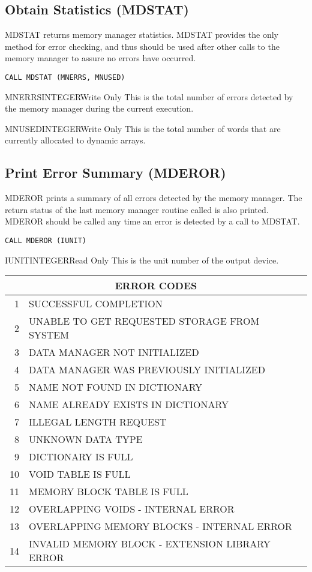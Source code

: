 \subsection{Obtain Statistics (MDSTAT)}
MDSTAT returns memory manager statistics.  MDSTAT provides the only method
for error checking, and thus should be used after other calls to the memory
manager to assure no errors have occurred.

\verb+CALL MDSTAT (MNERRS, MNUSED)+

\begin{argy}{MNERRS}{INTEGER}{Write Only}
This is the total number of errors detected by the memory manager during the
current execution. 
\end{argy}

\begin{argy}{MNUSED}{INTEGER}{Write Only}
This is the total number of words that are currently allocated to dynamic
arrays. 
\end{argy}

\subsection{Print Error Summary (MDEROR)}
MDEROR prints a summary of all errors detected by the memory manager.  The
return status of the last memory manager routine called is also printed.
MDEROR should be called any time an error is detected by a call to MDSTAT.

\verb+CALL MDEROR (IUNIT)+

\begin{argy}{IUNIT}{INTEGER}{Read Only}
This is the unit number of the output device.
\end{argy}

\begin{center}
\begin{tabular}{|rl|} \hline \hline
\multicolumn{2}{|c|}{ERROR CODES}\\ \hline
  1 &  SUCCESSFUL COMPLETION\\
  2 &  UNABLE TO GET REQUESTED STORAGE FROM SYSTEM\\
  3 &  DATA MANAGER NOT INITIALIZED\\
  4 &  DATA MANAGER WAS PREVIOUSLY INITIALIZED\\
  5 &  NAME NOT FOUND IN DICTIONARY\\
  6 &  NAME ALREADY EXISTS IN DICTIONARY\\
  7 &  ILLEGAL LENGTH REQUEST\\
  8 &  UNKNOWN DATA TYPE\\
  9 &  DICTIONARY IS FULL\\
 10 &  VOID TABLE IS FULL\\
 11 &  MEMORY BLOCK TABLE IS FULL\\
 12 &  OVERLAPPING VOIDS - INTERNAL ERROR\\
 13 &  OVERLAPPING MEMORY BLOCKS - INTERNAL ERROR\\
 14 &  INVALID MEMORY BLOCK - EXTENSION LIBRARY ERROR \\ \hline \hline
\end{tabular}
\end{center}

